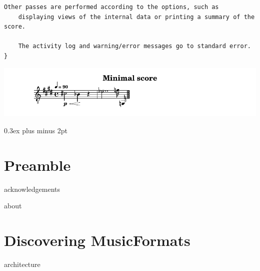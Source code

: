 \documentclass[11pt,a4paper]{report}
\begin{document}
\begin{titlepage}
\begin{center}
\begin{turn}{1}
{\begin{minipage}{\linewidth}
\begin{lstlisting}[language=Terminal]
    Other passes are performed according to the options, such as
    displaying views of the internal data or printing a summary of the score.

    The activity log and warning/error messages go to standard error.
}\end{lstlisting} %
\end{minipage}
}
\end{turn}

    \vspace{.5cm}

\includegraphics[scale=1.0]{../graphics/MinimalScore.png}

  \vfill

  \end{center}
\end{titlepage}


{ %
  \setlength {\parskip} {0.3ex plus \baselineskip minus 2pt}

  \tableofcontents

  \listoffigures
}


\part{Preamble}

{acknowledgements}

\fancyhead[L]{\nouppercase\leftmark}
\fancyhead[C]{}
\fancyhead[R]{\nouppercase\rightmark}

{about}


\part{Discovering MusicFormats}

{architecture}
\end{document}
